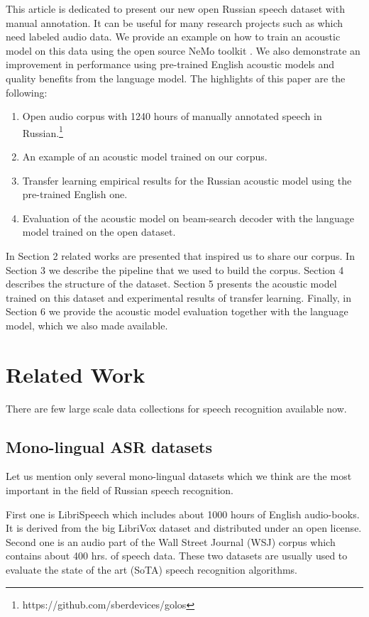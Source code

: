 \documentclass[a4paper]{article}
\begin{document}
This article is dedicated to present our new open Russian speech dataset with manual annotation. It can be useful for many research projects such as \cite{savchenko2008analyse, gubochkin2013cl} which need labeled audio data. We provide an example on how to train an acoustic model on this data using the open source NeMo toolkit \cite{kuchaiev2019nemo}. We also demonstrate an improvement in performance using pre-trained English acoustic models and quality benefits from the language model. The highlights of this paper are the following:
\begin{enumerate}
\item Open audio corpus with 1240 hours of manually annotated speech in Russian.\footnote{https://github.com/sberdevices/golos}
\item An example of an acoustic model trained on our corpus.
\item Transfer learning empirical results for the Russian acoustic model using the pre-trained English one.
\item Evaluation of the acoustic model on beam-search decoder with the language model trained on the open dataset.
\end{enumerate}


In Section 2 related works are presented that inspired us to share our corpus. In Section 3 we describe the pipeline that we used to build the corpus. Section 4 describes the structure of the dataset. Section 5 presents the acoustic model trained on this dataset and experimental results of transfer learning. Finally, in Section 6 we provide the acoustic model evaluation together with the language model, which we also made available.

\section{Related Work}

There are few large scale data collections for speech recognition available now. 

\subsection{Mono-lingual ASR datasets}

Let us mention only several mono-lingual datasets which we think are the most important in the field of Russian speech recognition.

First one is LibriSpeech \cite{panayotov2015librispeech} which includes about 1000 hours of English audio-books. It is derived from the big LibriVox dataset and distributed under an open license. Second one is an audio part of the Wall Street Journal (WSJ) corpus \cite{paul1992design} which contains about 400 hrs. of speech data. These two datasets are usually used to evaluate the state of the art (SoTA) speech recognition algorithms.
\end{document}
